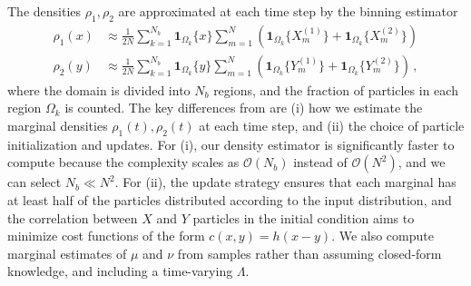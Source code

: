 \documentclass[11pt,a4paper,final]{article}
\newcommand{\1}{\mathbf{1}}
\theoremstyle{plain}
\numberwithin{equation}{section}
\numberwithin{theorem}{section}
\begin{document}
 The densities $\rho_1,\rho_2$ are approximated at each time step by the binning estimator
\begin{align*}
    \rho_1(x) &\approx \frac{1}{2N}\sum_{k=1}^{N_b} \mathbf 1_{\Omega_k}\{x \} \sum_{m=1}^{N}  (\mathbf 1_{\Omega_k}\{X_m^{(1)}\}+\mathbf 1_{\Omega_k}\{X_m^{(2)}\}) \\
    \rho_2(y) &\approx \frac{1}{2N}\sum_{k=1}^{N_b} \mathbf 1_{\Omega_k}\{y \} \sum_{m=1}^{N}  (\mathbf 1_{\Omega_k}\{Y_m^{(1)}\}+\mathbf 1_{\Omega_k}\{Y_m^{(2)}\}) \,,
\end{align*}
where the domain is divided into $N_b$ regions, and the fraction of particles in each region $\Omega_k$ is counted. 
The key differences from \cite{liu_approximating_2021} are (i) how we estimate the marginal densities $\rho_1(t),\rho_2(t)$ at each time step, and  (ii) the choice of particle initialization and updates. For (i), our density estimator is significantly faster to compute because the complexity scales as $\mathcal O(N_b)$ instead of $\mathcal O(N^2)$, and we can select $N_b \ll N^2$. For (ii), the update strategy ensures that each marginal has at least half of the particles distributed according to the input distribution, and the correlation between $X$ and $Y$ particles in the initial condition aims to minimize cost functions of the form $c(x,y)=h(x-y)$. We  also compute marginal estimates of $\mu$ and $\nu$ from samples rather than assuming closed-form knowledge, and including a time-varying $\Lambda$.
\end{document}
